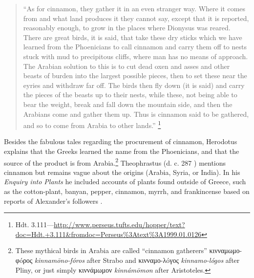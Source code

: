 \begin{quote}
    ``As for cinnamon, they gather it in an even stranger way. Where it comes from and what land produces it they cannot say, except that it is reported, reasonably enough, to grow in the places where Dionysus was reared. There are great birds, it is said, that take these dry sticks which we have learned from the Phoenicians to call cinnamon and carry them off to nests stuck with mud to precipitous cliffs, where man has no means of approach. The Arabian solution to this is to cut dead oxen and asses and other beasts of burden into the largest possible pieces, then to set these near the eyries and withdraw far off. The birds then fly down (it is said) and carry the pieces of the beasts up to their nests, while these, not being able to bear the weight, break and fall down the mountain side, and then the Arabians come and gather them up. Thus is cinnamon said to be gathered, and so to come from Arabia to other lands.'' \parencite[139]{herodotus_herodotus_1921}\footnote{Hdt. 3.111---\url{http://www.perseus.tufts.edu/hopper/text?doc=Hdt.+3.111&fromdoc=Perseus\%3Atext\%3A1999.01.0126}}
\end{quote}

Besides the fabulous tales regarding the procurement of cinnamon, Herodotus explains that the Greeks learned the name from the Phoenicians, and that the source of the product is from Arabia.\footnote{These mythical birds in Arabia are  called ``cinnamon gatherers'' κινναμωμο-φóρος \textit{kinnamōno-fóros} after Strabo and κινναμο-λóγος \textit{kinnamo-lógos} after Pliny, or just simply κιννάμωμον \textit{kinnámōmon} after Aristoteles.} Theophrastus (d. c. 287 \BC{}) mentions cinnamon but remains vague about the origins (Arabia, Syria, or India). In his \textit{Enquiry into Plants} he included accounts of plants found outside of Greece, such as the cotton-plant, banyan, pepper, cinnamon, myrrh, and frankincense based on reports of Alexander’s followers \parencite[xix,323]{theophrastus_enquiry_1916}.






